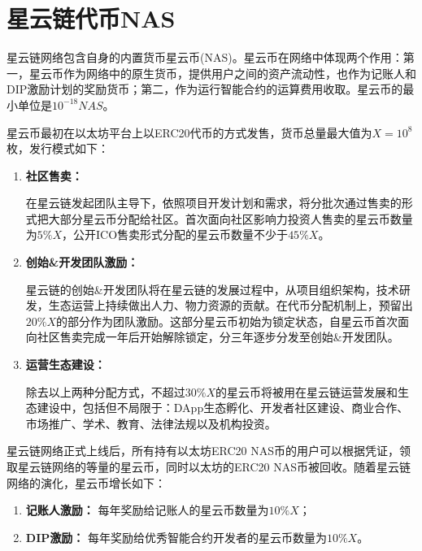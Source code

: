 \section{星云链代币NAS}
星云链网络包含自身的内置货币星云币(NAS)。星云币在网络中体现两个作用：第一，星云币作为网络中的原生货币，提供用户之间的资产流动性，也作为记账人和DIP激励计划的奖励货币；第二，作为运行智能合约的运算费用收取。星云币的最小单位是$10^{-18}NAS$。

星云币最初在以太坊平台上以ERC20代币的方式发售，货币总量最大值为$X=10^8$枚，发行模式如下：
\begin{enumerate}
	\item \textbf{社区售卖：}
	
在星云链发起团队主导下，依照项目开发计划和需求，将分批次通过售卖的形式把大部分星云币分配给社区。首次面向社区影响力投资人售卖的星云币数量为$5\%X$，公开ICO售卖形式分配的星云币数量不少于$45\%X$。

	\item \textbf{创始\&开发团队激励：}

星云链的创始\&开发团队将在星云链的发展过程中，从项目组织架构，技术研发，生态运营上持续做出人力、物力资源的贡献。在代币分配机制上，预留出$20\%X$的部分作为团队激励。这部分星云币初始为锁定状态，自星云币首次面向社区售卖完成一年后开始解除锁定，分三年逐步分发至创始\&开发团队。

	\item \textbf{运营生态建设：}

除去以上两种分配方式，不超过$30\%X$的星云币将被用在星云链运营发展和生态建设中，包括但不局限于：DApp生态孵化、开发者社区建设、商业合作、市场推广、学术、教育、法律法规以及机构投资。
\end{enumerate}

星云链网络正式上线后，所有持有以太坊ERC20 NAS币的用户可以根据凭证，领取星云链网络的等量的星云币，同时以太坊的ERC20 NAS币被回收。随着星云链网络的演化，星云币增长如下：
\begin{enumerate}
	\item \textbf{记账人激励：}
	每年奖励给记账人的星云币数量为$10\%X$；
	
	\item \textbf{DIP激励：}
	每年奖励给优秀智能合约开发者的星云币数量为$10\%X$。
\end{enumerate}